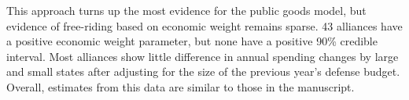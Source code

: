 \documentclass[12pt]{article}
\begin{document}
This approach turns up the most evidence for the public goods model, but evidence of free-riding based on economic weight remains sparse. 
43 alliances have a positive economic weight parameter, but none have a positive 90\% credible interval. 
Most alliances show little difference in annual spending changes by large and small states after adjusting for the size of the previous year's defense budget. 
Overall, estimates from this data are similar to those in the manuscript. 


\newpage
\singlespace


 
\end{document}
